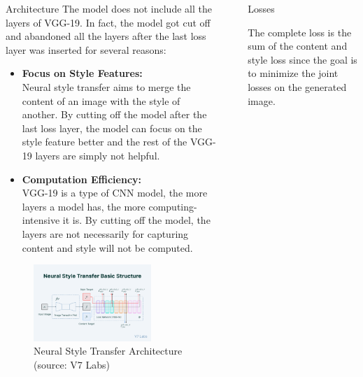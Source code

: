 \documentclass[final]{beamer}
\newlength{\sepwidth}
\newlength{\colwidth}
\newcommand{\separatorcolumn}{\begin{column}{\sepwidth}\end{column}}
\begin{document}
\begin{frame}[t]
\begin{columns}[t]
\begin{column}{\colwidth}
\begin{block}{Architecture}
        The model does not include all the layers of VGG-19. In fact, the model got cut off and abandoned all the layers after the last loss layer was inserted for several reasons:
        \begin{itemize}
            \item \textbf{Focus on Style Features:\\}
            Neural style transfer aims to merge the content of an image with the style of another. By cutting off the model after the last loss layer, the model can focus on the style feature better and the rest of the VGG-19 layers are simply not helpful.
            \item \textbf{Computation Efficiency:\\}
            VGG-19 is a type of CNN model, the more layers a model has, the more computing-intensive it is. By cutting off the model, the layers are not necessarily for capturing content and style will not be computed.
        \end{itemize}
        
        \begin{figure}
          \centering
            \includegraphics[width=0.75\textwidth]{figures/NST Architecture.png}
        
            \caption{Neural Style Transfer Architecture (source: V7 Labs)}
        \end{figure}
    
    \end{block}

\end{column}

\separatorcolumn

\begin{column}{\colwidth}

  \begin{alertblock}{Losses}

    The complete loss is the sum of the content and style loss since the goal is to minimize the joint losses on the generated image.


\end{alertblock}
\end{column}
\end{columns}
\end{frame}
\end{document}
